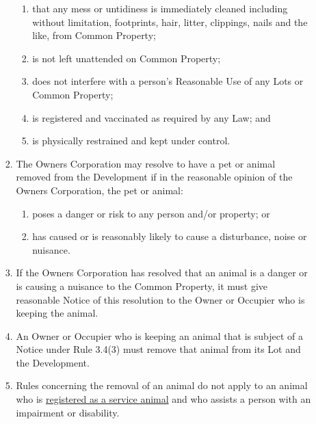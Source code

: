 \documentclass{article}
\begin{document}
\begin{enumerate}[label=\arabic*.]
\begin{enumerate}[label=\arabic{enumi}.\arabic*.]
\begin{enumerate}[label=(\arabic*)]
\begin{enumerate}[label=(\alph*)]
\item  that any mess or untidiness is immediately cleaned including without limitation, footprints, hair, litter, clippings, nails and the like,  from Common Property;

\item  is not left unattended on Common Property;

\item  does not interfere with a person’s Reasonable Use of any Lots or Common Property;

\item  is registered and vaccinated as required by any Law; and

\item  is physically restrained and kept under control.

\end{enumerate}

\item  The Owners Corporation may resolve to have a pet or animal removed from the Development if in the reasonable opinion of the Owners Corporation, the pet or animal:
\newpage



\begin{enumerate}[label=(\alph*)]

\item  poses a danger or risk to any person and/or property; or

\item  has caused or is reasonably likely to cause a disturbance, noise or nuisance.

\end{enumerate}

\item  If the Owners Corporation has resolved that an animal is a danger or is causing a nuisance to the Common Property, it must give reasonable Notice of this resolution to the Owner or Occupier who is keeping the animal.

\item  An Owner or Occupier who is keeping an animal that is subject of a Notice under Rule 3.4(3) must remove that animal from its Lot and the Development.

\item  Rules concerning the removal of an animal do not apply to an animal who is \href{https://agriculture.vic.gov.au/livestock-and-animals/animal-welfare-victoria/domestic-animals-act/registration-legislation-and-permits/updates/assistance-dog-registration-scheme}{registered as a service animal} and who assists a person with an impairment or disability.


\end{enumerate}
\end{enumerate}
\end{enumerate}
\end{document}
